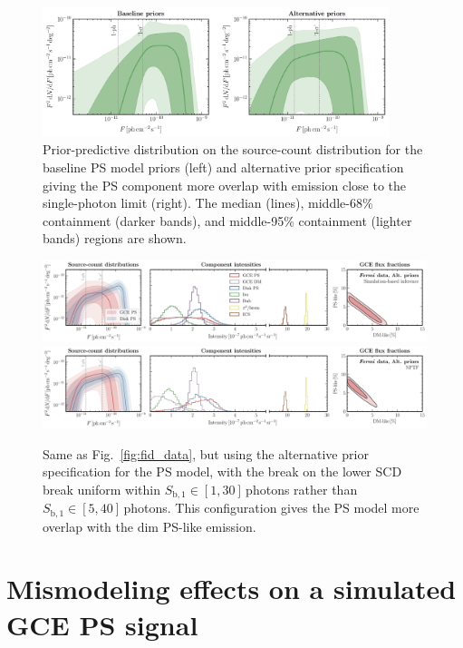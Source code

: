 \documentclass[prd,aps,10pt,nofootinbib,twocolumn,superscriptaddress,preprintnumbers,balancelastpage,longbibliography,floatfix]{revtex4-2}
\begin{document}
%
\begin{figure}[!t]
\centering
\includegraphics[width=0.9\textwidth]{plots/pp_check.pdf}
\caption{Prior-predictive distribution on the source-count distribution for the baseline PS model priors (left) and alternative prior specification giving the PS component more overlap with emission close to the single-photon limit (right). The median (lines), middle-68\% containment (darker bands), and middle-95\% containment (lighter bands) regions are shown.}
\label{fig:pp_check}
\end{figure}
%

%
\begin{figure}[!t]
\centering
\includegraphics[width=1.\textwidth]{plots/data_fid_sbi_new_ps_priors.pdf}
\includegraphics[width=1.\textwidth]{plots/data_fid_nptf_new_ps_priors.pdf}
\caption{Same as Fig.~\ref{fig:fid_data}, but using the alternative prior specification for the PS model, with the break on the lower SCD break uniform within $S_{\mathrm{b}, 1}  \in  [1, 30]$\,photons rather than $S_{\mathrm{b}, 1}  \in  [5, 40]$\,photons. This configuration gives the PS model more overlap with the dim PS-like emission.}
\label{fig:fid_data_alt_priors}
\end{figure}
%

\section{Mismodeling effects on a simulated GCE PS signal}
\label{app:mismodeling_ps}
\end{document}
